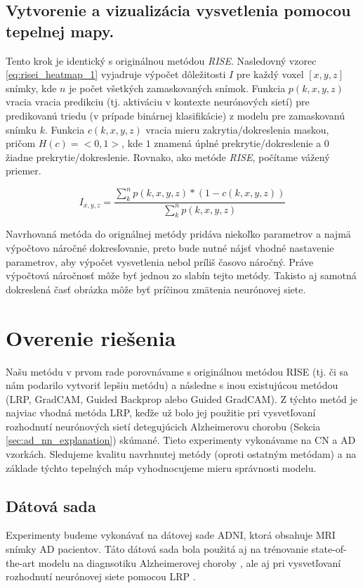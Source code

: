 \subsection{Vytvorenie a vizualizácia vysvetlenia pomocou tepelnej mapy.}

Tento krok je identický s originálnou metódou \textit{RISE}. Nasledovný vzorec \ref{eq:risei_heatmap_1} vyjadruje výpočet dôležitosti $I$ pre každý voxel $[x, y, z]$ snímky, kde $n$ je počet všetkých zamaskovaných snímok. Funkcia $p(k, x, y, z)$ vracia vracia predikciu (tj. aktiváciu v kontexte neurónových sietí) pre predikovanú triedu (v prípade binárnej klasifikácie) z modelu pre zamaskovanú snímku $k$. Funkcia $c(k, x, y, z)$ vracia mieru zakrytia/dokreslenia maskou, pričom $H(c) = <0, 1>$, kde $1$ znamená úplné prekrytie/dokreslenie a $0$ žiadne prekrytie/dokreslenie. Rovnako, ako metóde \textit{RISE}, počítame vážený priemer.

\begin{equation} 
    I_{x, y, z} = \frac{\sum_{k}^{n} p(k, x, y, z) * (1 - c(k, x, y, z))}{\sum_{k}^{n} p(k, x, y, z)}
    \label{eq:risei_heatmap_1}
\end{equation}

Navrhovaná metóda do orignálnej metódy pridáva niekoľko parametrov a najmä výpočtovo náročné dokresľovanie, preto bude nutné nájsť vhodné nastavenie parametrov, aby výpočet vysvetlenia nebol príliš časovo náročný. Práve výpočtová náročnosť môže byť jednou zo slabín tejto metódy. Takisto aj samotná dokreslená časť obrázka môže byť príčinou zmätenia neurónovej siete.

\section{Overenie riešenia \label{sec:evaluation_design}}

Našu metódu v prvom rade porovnávame s originálnou metódou RISE (tj. či sa nám podarilo vytvoriť lepšiu metódu) a následne s inou existujúcou metódou (LRP, GradCAM, Guided Backprop alebo Guided GradCAM). Z týchto metód je najviac vhodná metóda LRP, keďže už bolo jej použitie pri vysvetľovaní rozhodnutí neurónových sietí detegujúcich Alzheimerovu chorobu (Sekcia \ref{sec:ad_nn_explanation}) skúmané. Tieto experimenty vykonávame na CN a AD vzorkách. Sledujeme kvalitu navrhnutej metódy (oproti ostatným metódam) a na základe týchto tepelných máp vyhodnocujeme mieru správnosti modelu.

\subsection{Dátová sada} Experimenty budeme vykonávať na dátovej sade ADNI, ktorá obsahuje MRI snímky AD pacientov. Táto dátová sada bola použitá aj na trénovanie state-of-the-art modelu na diagnsotiku Alzheimerovej choroby \cite{esmaeilzadeh2018end}, ale aj pri vysvetľovaní rozhodnutí neurónovej siete pomocou LRP \cite{bohle2019layer}. 

